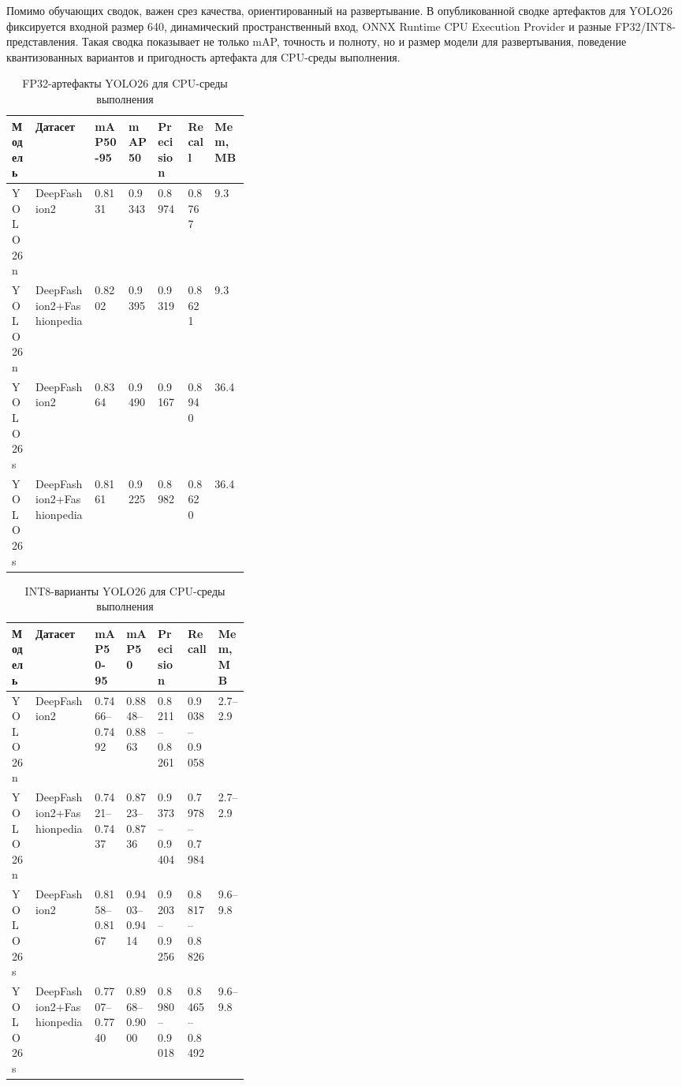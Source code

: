 \documentclass[12pt,a4paper,oneside,openany]{report}
\begin{document}
Помимо обучающих сводок, важен срез качества, ориентированный на развертывание. В опубликованной
сводке артефактов для YOLO26 фиксируется входной размер 640, динамический пространственный вход,
ONNX Runtime CPU Execution Provider и разные FP32/INT8-представления. Такая сводка показывает не
только mAP, точность и полноту, но и размер модели для развертывания, поведение квантизованных
вариантов и пригодность артефакта для CPU-среды выполнения.

\begin{table}[!htbp]
  \centering
  \caption{FP32-артефакты YOLO26 для CPU-среды выполнения}
  \label{tab:yolo_model_zoo_artifacts}
  \scriptsize
  \begin{tabularx}{\linewidth}{@{}P{0.10\linewidth}P{0.25\linewidth}Z Z Z Z Z@{}}
    \toprule
    Модель & Датасет & mAP50-95 & mAP50 & Precision & Recall & Mem, MB \\
    \midrule
    YOLO26n & DeepFashion2 & 0.8131 & 0.9343 & 0.8974 & 0.8767 & 9.3 \\
    YOLO26n & DeepFashion2+Fashionpedia & 0.8202 & 0.9395 & 0.9319 & 0.8621 & 9.3 \\
    YOLO26s & DeepFashion2 & 0.8364 & 0.9490 & 0.9167 & 0.8940 & 36.4 \\
    YOLO26s & DeepFashion2+Fashionpedia & 0.8161 & 0.9225 & 0.8982 & 0.8620 & 36.4 \\
    \bottomrule
  \end{tabularx}
\end{table}

\begin{table}[!htbp]
  \centering
  \caption{INT8-варианты YOLO26 для CPU-среды выполнения}
  \label{tab:yolo_model_zoo_int8}
  \scriptsize
  \begin{tabularx}{\linewidth}{@{}P{0.10\linewidth}P{0.25\linewidth}Z Z Z Z Z@{}}
    \toprule
    Модель & Датасет & mAP50-95 & mAP50 & Precision & Recall & Mem, MB \\
    \midrule
    YOLO26n &
    DeepFashion2 &
    0.7466--0.7492 &
    0.8848--0.8863 &
    0.8211--0.8261 &
    0.9038--0.9058 &
    2.7--2.9 \\
    YOLO26n &
    DeepFashion2+Fashionpedia &
    0.7421--0.7437 &
    0.8723--0.8736 &
    0.9373--0.9404 &
    0.7978--0.7984 &
    2.7--2.9 \\
    YOLO26s &
    DeepFashion2 &
    0.8158--0.8167 &
    0.9403--0.9414 &
    0.9203--0.9256 &
    0.8817--0.8826 &
    9.6--9.8 \\
    YOLO26s &
    DeepFashion2+Fashionpedia &
    0.7707--0.7740 &
    0.8968--0.9000 &
    0.8980--0.9018 &
    0.8465--0.8492 &
    9.6--9.8 \\
    \bottomrule
  \end{tabularx}
\end{table}
\end{document}
